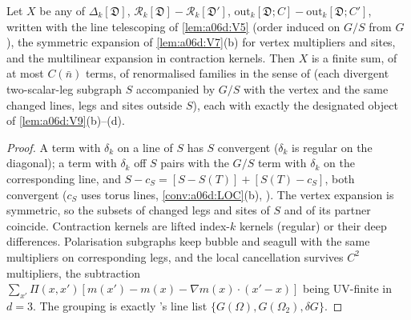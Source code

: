 
\begin{lemma}\label{lem:a06d:K2}
Let $X$ be any of $\Delta_k[\mathfrak D]$, $\mathcal R_k[\mathfrak D]-\mathcal R_k[\mathfrak D']$, $\mathrm{out}_k[\mathfrak D;C]-\mathrm{out}_k[\mathfrak D;C']$, written with the line telescoping of \cref{lem:a06d:V5} (order induced on $G/S$ from $G$), the symmetric expansion of \cref{lem:a06d:V7}(b) for vertex multipliers and sites, and the multilinear expansion in contraction kernels. Then $X$ is a finite sum, of at most $C(\bar n)$ terms, of renormalised families in the sense of \cite[p.~420]{Ba3} (each divergent two-scalar-leg subgraph $S$ accompanied by $G/S$ with the \cite[(1.7)]{Ba3} vertex and the same changed lines, legs and sites outside $S$), each with exactly the designated object of \cref{lem:a06d:V9}(b)--(d).
\end{lemma}

\begin{proof}
A term with $\delta_k$ on a line of $S$ has $S$ convergent ($\delta_k$ is regular on the diagonal); a term with $\delta_k$ off $S$ pairs with the $G/S$ term with $\delta_k$ on the corresponding line, and $S-c_S=[S-S(T)]+[S(T)-c_S]$, both convergent ($c_S$ uses torus lines, \cref{conv:a06d:LOC}(b), \cite[(1.31)]{Ba3}). The vertex expansion is symmetric, so the subsets of changed legs and sites of $S$ and of its partner coincide. Contraction kernels are lifted index-$k$ kernels (regular) or their deep differences. Polarisation subgraphs keep bubble and seagull with the same multipliers on corresponding legs, and the local cancellation survives $C^2$ multipliers, the subtraction $\sum_{x'}\Pi(x,x')[m(x')-m(x)-\nabla m(x)\cdot(x'-x)]$ being UV-finite in $d=3$. The grouping is exactly \cite[p.~414]{Ba3}'s line list $\{G(\Omega),G(\Omega_2),\delta G\}$.
\end{proof}

